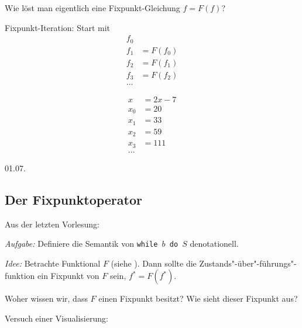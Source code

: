 \begin{remark}[Intuition]
    Wie löst man eigentlich eine Fixpunkt-Gleichung $f = F(f)$?

    Fixpunkt-Iteration: Start mit \begin{align*}
        f_0 & \\
        f_1 & = F(f_0) \\
        f_2 & = F(f_1) \\
        f_3 & = F(f_2) \\
        \dots
    \end{align*}
\end{remark}

\begin{example}
    \begin{align*}
        x & = 2x - 7 \\
        x_0 & = 20 \\
        x_1 & = 33 \\
        x_2 & = 59 \\
        x_3 & = 111 \\
        \dots
    \end{align*}
\end{example}


\newpage
\hfill 01.07.

\subsection{Der Fixpunktoperator}

\begin{remark}[Recap]
    Aus der letzten Vorlesung:

    \emph{Aufgabe:} Definiere die Semantik von \texttt{while $b$ do $S$} denotationell.

    \emph{Idee:} Betrachte Funktional $F$ (siehe ). Dann sollte die Zustands"-über"-führungs"-funktion ein Fixpunkt von $F$ sein, \dh{} $f^* = F(f^*)$.
\end{remark}

\par\bigskip
\begin{question}
    Woher wissen wir, dass $F$ einen Fixpunkt besitzt? Wie sieht dieser Fixpunkt aus?
\end{question}

\par\bigskip
Versuch einer Visualisierung:

